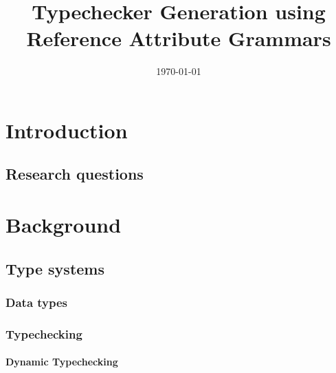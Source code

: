 \documentclass[nofilelist]{cslthse-msc}
\title{Typechecker Generation using Reference Attribute Grammars}
\date{\today}
\begin{document}
\renewcommand{\bibname}{References}

\makefrontmatter
\chapter{Introduction} %
\section{Research questions}
\begin{itemize}
\end{itemize}

\chapter{Background}
\section{Type systems}
\subsection{Data types}
\subsection{Typechecking}
\subsubsection{Dynamic Typechecking}
\end{document}
